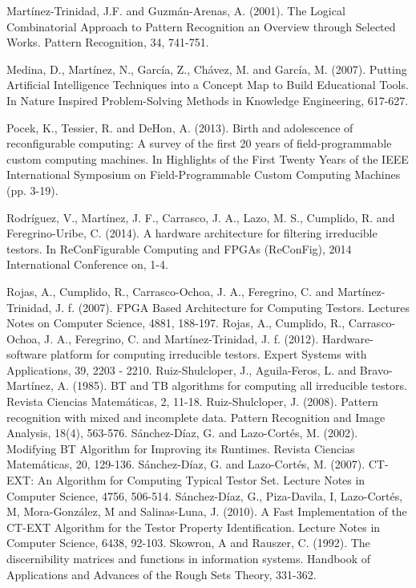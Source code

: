 \documentclass[authoryear,preprint,review,12pt]{elsarticle}
\begin{document}
\begin{thebibliography}{00}
Mart\'inez-Trinidad, J.F. and Guzm\'an-Arenas, A. (2001). The Logical Combinatorial Approach to Pattern Recognition an Overview through Selected Works. Pattern Recognition, 34, 741-751.

Medina, D., Mart\'inez, N., Garc\'ia, Z., Ch\'avez, M. and Garc\'ia, M. (2007). Putting Artificial Intelligence Techniques into a Concept Map to Build Educational Tools. In Nature Inspired Problem-Solving Methods in Knowledge Engineering, 617-627.

Pocek, K., Tessier, R. and DeHon, A. (2013). Birth and adolescence of reconfigurable computing: A survey of the first 20 years of field-programmable custom computing machines. In Highlights of the First Twenty Years of the IEEE International Symposium on Field-Programmable Custom Computing Machines (pp. 3-19).

 Rodr\'iguez, V., Mart\'inez, J. F., Carrasco, J. A., Lazo, M. S., Cumplido, R. and Feregrino-Uribe, C. (2014). A hardware architecture for filtering irreducible testors. In ReConFigurable Computing and FPGAs (ReConFig), 2014 International Conference on, 1-4.

Rojas, A., Cumplido, R., Carrasco-Ochoa, J. A., Feregrino, C. and Mart\'inez-Trinidad, J. f. (2007). FPGA Based Architecture for Computing Testors. Lectures Notes on Computer Science, 4881, 188-197.
Rojas, A., Cumplido, R., Carrasco-Ochoa, J. A., Feregrino, C. and Mart\'inez-Trinidad, J. f. (2012). Hardware-software platform for computing irreducible testors. Expert Systems with Applications, 39, 2203 - 2210.
Ruiz-Shulcloper, J., Aguila-Feros, L. and Bravo-Mart\'inez, A. (1985). BT and TB algorithms for computing all irreducible testors. Revista Ciencias Matem\'aticas, 2, 11-18.
Ruiz-Shulcloper, J. (2008). Pattern recognition with mixed and incomplete data. Pattern Recognition and Image Analysis, 18(4), 563-576.
S\'anchez-D\'iaz, G. and Lazo-Cort\'es, M. (2002). Modifying BT Algorithm for Improving its Runtimes. Revista Ciencias Matem\'aticas, 20, 129-136.
S\'anchez-D\'iaz, G. and Lazo-Cort\'es, M. (2007). CT-EXT: An Algorithm for Computing Typical Testor Set. Lecture Notes in Computer Science, 4756, 506-514.
S\'anchez-D\'iaz, G., Piza-Davila, I, Lazo-Cort\'es, M, 
Mora-Gonz\'alez, M and Salinas-Luna, J. (2010). A Fast Implementation of the CT-EXT Algorithm for the Testor Property Identification. Lecture Notes in Computer Science, 6438, 92-103.
Skowron, A and Rauszer, C. (1992). The discernibility matrices and functions in information systems. Handbook of Applications and Advances of the Rough Sets Theory, 331-362.


\end{thebibliography}
\end{document}
